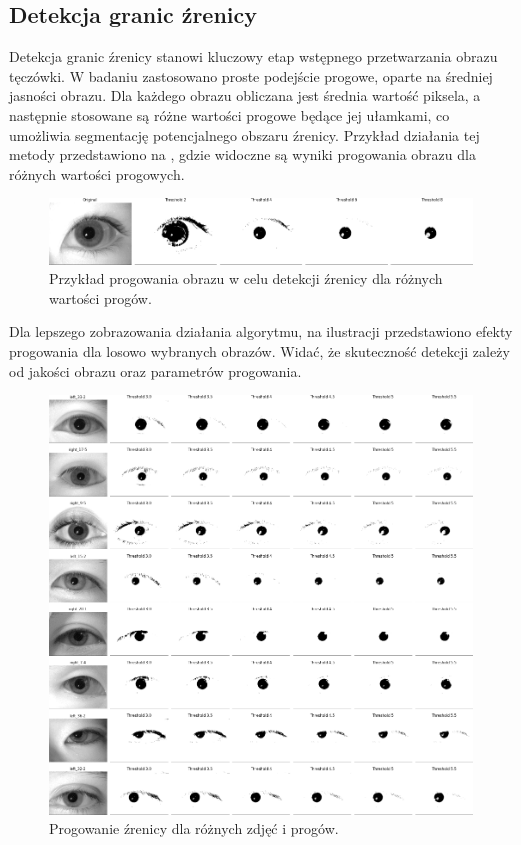 \documentclass[a4paper]{article}
\begin{document}
\subsection{Detekcja granic źrenicy}
Detekcja granic źrenicy stanowi kluczowy etap wstępnego przetwarzania obrazu tęczówki. W badaniu zastosowano proste podejście progowe, oparte na średniej jasności obrazu. Dla każdego obrazu obliczana jest średnia wartość piksela, a następnie stosowane są różne wartości progowe będące jej ułamkami, co umożliwia segmentację potencjalnego obszaru źrenicy. Przykład działania tej metody przedstawiono na , gdzie widoczne są wyniki progowania obrazu dla różnych wartości progowych.

\begin{figure}[H]
    \centering
    \includegraphics[width=0.9\linewidth]{figures/pupil_thresholds.png}
    \caption{Przykład progowania obrazu w celu detekcji źrenicy dla różnych wartości progów.}
    \label{fig:pupil_thresholds}
\end{figure}

Dla lepszego zobrazowania działania algorytmu, na ilustracji  przedstawiono efekty progowania dla losowo wybranych obrazów. Widać, że skuteczność detekcji zależy od jakości obrazu oraz parametrów progowania.

\begin{figure}[H]
    \centering
    \includegraphics[width=0.9\linewidth]{figures/pupil_thresholds_many.png}
    \caption{Progowanie źrenicy dla różnych zdjęć i progów.}
    \label{fig:pupil_thresholds_many}
\end{figure}
\end{document}
